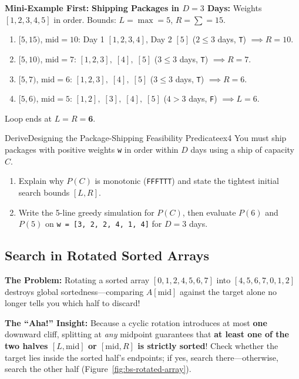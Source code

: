 \documentclass[11pt,a4paper]{article}
\theoremstyle{definition}
\newcommand{\painbeat}{\textbf{\color{accentamber}The Problem:} }
\newcommand{\ahabeat}{\textbf{\color{accentteal}The ``Aha!'' Insight:} }
\newcommand{\examplebeat}{\textbf{\color{primaryblue}Mini-Example First:} }
\begin{document}
\examplebeat \textbf{Shipping Packages in $D = 3$ Days:} Weights $[1, 2, 3, 4, 5]$ in order. Bounds: $L = \max = 5$, $R = \sum = 15$.
\begin{enumerate}
    \item $[5, 15)$, $\text{mid} = 10$: Day 1 $[1,2,3,4]$, Day 2 $[5]$ ($2 \le 3$ days, \texttt{T}) $\implies R = 10$.
    \item $[5, 10)$, $\text{mid} = 7$: $[1,2,3],\; [4],\; [5]$ ($3 \le 3$ days, \texttt{T}) $\implies R = 7$.
    \item $[5, 7)$, $\text{mid} = 6$: $[1,2,3],\; [4],\; [5]$ ($3 \le 3$ days, \texttt{T}) $\implies R = 6$.
    \item $[5, 6)$, $\text{mid} = 5$: $[1,2],\; [3],\; [4],\; [5]$ ($4 > 3$ days, \texttt{F}) $\implies L = 6$.
\end{enumerate}
Loop ends at $L = R = \mathbf{6}$.

\begin{tryitbox}{Derive}{Designing the Package-Shipping Feasibility Predicate}{ex4}
You must ship packages with positive weights \texttt{w} in order within $D$ days using a ship of capacity $C$.
\begin{enumerate}
    \item Explain why $P(C)$ is monotonic (\texttt{FFFTTT}) and state the tightest initial search bounds $[L, R]$.
    \item Write the 5-line greedy simulation for $P(C)$, then evaluate $P(6)$ and $P(5)$ on \texttt{w = [3, 2, 2, 4, 1, 4]} for $D = 3$ days.
\end{enumerate}
\end{tryitbox}

\subsection{Search in Rotated Sorted Arrays}

\painbeat Rotating a sorted array $[0, 1, 2, 4, 5, 6, 7]$ into $[4, 5, 6, 7, 0, 1, 2]$ destroys global sortedness---comparing $A[\text{mid}]$ against the target alone no longer tells you which half to discard!

\ahabeat Because a cyclic rotation introduces at most \textbf{one} downward cliff, splitting at \emph{any} midpoint guarantees that \textbf{at least one of the two halves $[L, \text{mid}]$ or $[\text{mid}, R]$ is strictly sorted}! Check whether the target lies inside the sorted half's endpoints; if yes, search there---otherwise, search the other half (Figure~\ref{fig:bs-rotated-array}).
\end{document}
